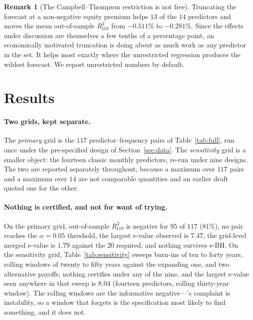 \documentclass{article}
\theoremstyle{plain}
\theoremstyle{definition}
\newtheorem{remark}[theorem]{Remark}
\newcommand{\rsq}{R^2_{OS}}
\begin{document}
\begin{remark}[The Campbell--Thompson restriction is not free]
Truncating the forecast at a non-negative equity premium helps $13$ of the $14$ predictors and
moves the mean out-of-sample $\rsq$ from $-0.511\%$ to $-0.281\%$. Since the effects under
discussion are themselves a few tenths of a percentage point, an economically motivated
truncation is doing about as much work as any predictor in the set. It helps most exactly
where the unrestricted regression produces the wildest forecast. We report unrestricted
numbers by default.
\end{remark}

\section{Results}
\label{sec:results}

\paragraph{Two grids, kept separate.} The \emph{primary} grid is the $117$
predictor--frequency pairs of Table~\ref{tab:full}, run once under the pre-specified design of
Section~\ref{sec:data}. The \emph{sensitivity} grid is a smaller object: the fourteen classic
monthly predictors, re-run under nine designs. The two are reported separately throughout,
because a maximum over $117$ pairs and a maximum over $14$ are not comparable quantities and an
earlier draft quoted one for the other.

\paragraph{Nothing is certified, and not for want of trying.} On the primary grid, out-of-sample
$\rsq$ is negative for $95$ of $117$ ($81\%$), no pair reaches the $\alpha=0.05$ threshold, the
largest e-value observed is $7.47$, the grid-level merged e-value is $1.79$ against the $20$
required, and nothing survives e-BH. On the sensitivity grid, Table~\ref{tab:sensitivity} sweeps
burn-ins of ten to forty years, rolling windows of twenty to fifty years against the expanding
one, and two alternative payoffs; nothing certifies under any of the nine, and the largest
e-value seen anywhere in that sweep is $8.04$ (fourteen predictors, rolling thirty-year window).
The rolling windows are the informative negative---\citeauthor{welch2008}'s complaint is
instability, so a window that forgets is the specification most likely to find something, and it
does not.
\end{document}
